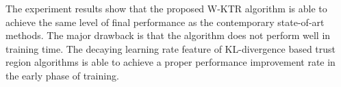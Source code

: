 The experiment results show that the proposed W-KTR algorithm is able to achieve the same level of final performance as the contemporary state-of-art methods. The major drawback is that the algorithm does not perform well in training time. The decaying learning rate feature of KL-divergence based trust region algorithms is able to achieve a proper performance improvement rate in the early phase of training.